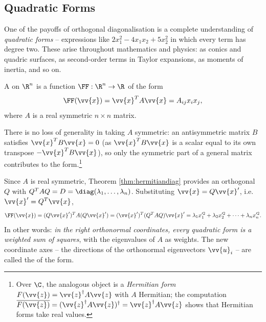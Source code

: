 \subsection{Quadratic Forms}

One of the payoffs of orthogonal diagonalisation is a complete understanding of \emph{quadratic forms} -- expressions like $2x_1^2 - 4x_1x_2 + 5x_2^2$ in which every term has degree two. These arise throughout mathematics and physics: as conics and quadric surfaces, as second-order terms in Taylor expansions, as moments of inertia, and so on.

\begin{definition}
	A  on $\R^n$ is a function $\FF: \R^n \rightarrow \R$ of the form
	$$
	\FF(\vv{x}) = \vv{x}^T A \vv{x} = A_{ij}x_ix_j,
	$$
	where $A$ is a real symmetric $n \times n$ matrix.
\end{definition}

There is no loss of generality in taking $A$ symmetric: an antisymmetric matrix $B$ satisfies $\vv{x}^TB\vv{x} = 0$ (as $\vv{x}^TB\vv{x}$ is a scalar equal to its own transpose $-\vv{x}^TB\vv{x}$), so only the symmetric part of a general matrix contributes to the form.\footnote{Over $\C$, the analogous object is a \emph{Hermitian form} $F(\vv{z}) = \vv{z}^\dagger A \vv{z}$ with $A$ Hermitian; the computation $\overline{F(\vv{z})} = (\vv{z}^\dagger A \vv{z})^\dagger = \vv{z}^\dagger A \vv{z}$ shows that Hermitian forms take real values.}

Since $A$ is real symmetric, Theorem \ref{thm:hermitiandiag} provides an orthogonal $Q$ with $Q^TAQ = D = \diag(\lambda_1, \dots, \lambda_n)$. Substituting $\vv{x} = Q\vv{x}'$, i.e.\ $\vv{x}' = Q^T \vv{x}$,
$$
\FF(\vv{x}) = (Q\vv{x}')^T A (Q \vv{x}') = (\vv{x}')^T (Q^TAQ) \vv{x}' = \lambda_1 x_1'^2 + \lambda_2 x_2'^2 + \cdots + \lambda_n x_n'^2.
$$
In other words: \emph{in the right orthonormal coordinates, every quadratic form is a weighted sum of squares}, with the eigenvalues of $A$ as weights. The new coordinate axes -- the directions of the orthonormal eigenvectors $\vv{u}_i$ -- are called the  of the form.

